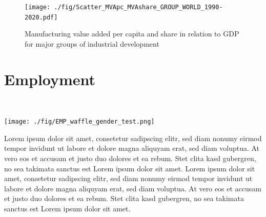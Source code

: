 \documentclass[
  openany, nofonts]{tufte-book}
\begin{document}
\pagebreak

\vspace*{\fill}

\begin{figure}
\texttt{[image: ./fig/Scatter\_MVApc\_MVAshare\_GROUP\_WORLD\_1990-2020.pdf]} \end{figure}

\begin{figure}
\newline{}\caption[MVA per capita and MVA share for major development groups]{Manufacturing value added per capita and share in relation to GDP for major groups of industrial development}\label{fig:c02-scatter-groups2}
\end{figure}

\clearpage\pagebreak

\hypertarget{employment}{%
\section{Employment}\label{employment}}

~

\begin{marginfigure}
\texttt{[image: ./fig/EMP\_waffle\_gender\_test.png]} \end{marginfigure}

Lorem ipsum dolor sit amet, consetetur sadipscing elitr, sed diam nonumy eirmod tempor invidunt ut labore et dolore magna aliquyam erat, sed diam voluptua. At vero eos et accusam et justo duo dolores et ea rebum. Stet clita kasd gubergren, no sea takimata sanctus est Lorem ipsum dolor sit amet. Lorem ipsum dolor sit amet, consetetur sadipscing elitr, sed diam nonumy eirmod tempor invidunt ut labore et dolore magna aliquyam erat, sed diam voluptua. At vero eos et accusam et justo duo dolores et ea rebum. Stet clita kasd gubergren, no sea takimata sanctus est Lorem ipsum dolor sit amet.

\vspace*{\fill}
\end{document}
